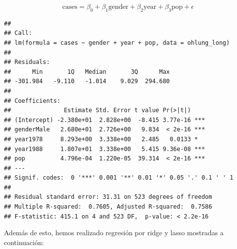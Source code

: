 \documentclass[
  12pt,
]{article}
\newenvironment{Shaded}{\begin{snugshade}}{\end{snugshade}}
\newcommand{\AttributeTok}[1]{\textcolor[rgb]{0.13,0.29,0.53}{#1}}
\newcommand{\DecValTok}[1]{\textcolor[rgb]{0.00,0.00,0.81}{#1}}
\newcommand{\FunctionTok}[1]{\textcolor[rgb]{0.13,0.29,0.53}{\textbf{#1}}}
\newcommand{\NormalTok}[1]{#1}
\newcommand{\OtherTok}[1]{\textcolor[rgb]{0.56,0.35,0.01}{#1}}
\newcommand{\SpecialCharTok}[1]{\textcolor[rgb]{0.81,0.36,0.00}{\textbf{#1}}}
\begin{document}
\[ \text{cases} = \beta_0  + \beta_1 \text{gender} + \beta_2 \text{year} + \beta_3 \text{pop} + \epsilon \]

\begin{verbatim}
## 
## Call:
## lm(formula = cases ~ gender + year + pop, data = ohlung_long)
## 
## Residuals:
##      Min       1Q   Median       3Q      Max 
## -301.984   -9.110   -1.014    9.029  294.680 
## 
## Coefficients:
##               Estimate Std. Error t value Pr(>|t|)    
## (Intercept) -2.380e+01  2.828e+00  -8.415 3.77e-16 ***
## genderMale   2.680e+01  2.726e+00   9.834  < 2e-16 ***
## year1978     8.293e+00  3.338e+00   2.485   0.0133 *  
## year1988     1.807e+01  3.338e+00   5.415 9.36e-08 ***
## pop          4.796e-04  1.220e-05  39.314  < 2e-16 ***
## ---
## Signif. codes:  0 '***' 0.001 '**' 0.01 '*' 0.05 '.' 0.1 ' ' 1
## 
## Residual standard error: 31.31 on 523 degrees of freedom
## Multiple R-squared:  0.7605, Adjusted R-squared:  0.7586 
## F-statistic: 415.1 on 4 and 523 DF,  p-value: < 2.2e-16
\end{verbatim}

Además de esto, hemos realizado regresión por ridge y lasso mostradas a
continuación:

\begin{Shaded}
\end{Shaded}
\end{document}

